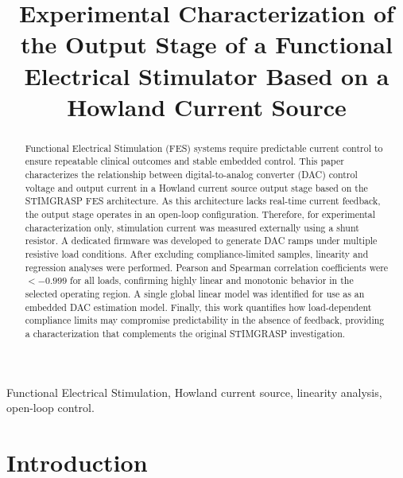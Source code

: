 \documentclass[conference]{IEEEtran}
\begin{document}
\raggedbottom

\title{Experimental Characterization of the Output Stage of a Functional Electrical Stimulator Based on a Howland Current Source}

\author{
}
\maketitle

\begin{abstract}
Functional Electrical Stimulation (FES) systems require predictable current control to ensure repeatable clinical outcomes and stable embedded control. This paper characterizes the relationship between digital-to-analog converter (DAC) control voltage and output current in a Howland current source output stage based on the STIMGRASP FES architecture. As this architecture lacks real-time current feedback, the output stage operates in an open-loop configuration. Therefore, for experimental characterization only, stimulation current was measured externally using a shunt resistor. A dedicated firmware was developed to generate DAC ramps under multiple resistive load conditions. After excluding compliance-limited samples, linearity and regression analyses were performed. Pearson and Spearman correlation coefficients were $<-0.999$ for all loads, confirming highly linear and monotonic behavior in the selected operating region. A single global linear model was identified for use as an embedded DAC estimation model. Finally, this work quantifies how load-dependent compliance limits may compromise predictability in the absence of feedback, providing a characterization that complements the original STIMGRASP investigation.
\end{abstract}


\begin{IEEEkeywords}
Functional Electrical Stimulation, Howland current source, linearity analysis, open-loop control.
\end{IEEEkeywords}

\section{Introduction}
\end{document}
